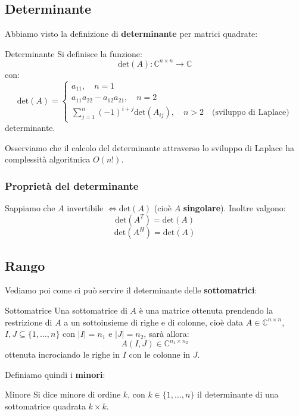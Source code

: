 \documentclass[a4paper,11pt]{article}
\begin{document}
\subsection{Determinante}
Abbiamo visto la definizione di \textbf{determinante} per matrici quadrate:
\begin{definition}{Determinante}
	Si definisce la funzione:
	$$
		\mathrm{det}(A) : \mathbb{C}^{n \times n} \rightarrow \mathbb{C}
	$$
	con:
	$$
		\mathrm{det}(A) =
			\begin{cases}
				a_{11}, \quad n = 1 \\ 
				a_{11} a_{22} - a_{12} a_{21}, \quad n = 2 \\ 
				\sum_{j = 1}^n (-1)^{i + j} \mathrm{det}(A_{ij}), \quad n > 2 \quad \text{(sviluppo di Laplace)}
			\end{cases}
	$$
	determinante.
\end{definition}

Osserviamo che il calcolo del determinante attraverso lo sviluppo di Laplace ha complessità algoritmica $O(n!)$.

\subsubsection{Proprietà del determinante}
Sappiamo che $A$ invertibile $\Leftrightarrow \mathrm{det}(A)$ (cioè $A$ \textbf{singolare}).
Inoltre valgono:
$$
\mathrm{det}(A^T) = \mathrm{det}(A)
$$
$$
\mathrm{det}(A^H) = \overline{\mathrm{det}(A)}
$$

\subsection{Rango}
Vediamo poi come ci può servire il determinante delle \textbf{sottomatrici}:
\begin{definition}{Sottomatrice}
	Una sottomatrice di $A$ è una matrice ottenuta prendendo la restrizione di $A$ a un sottoinsieme di righe e di colonne, cioè data $A \in \mathbb{C}^{n \times n}$, $I, J \subseteq \{ 1, ..., n \}$ con $|I| = n_1$ e $|J| = n_2$, sarà allora:
	$$
		A(I, J) \in \mathbb{C}^{n_1 \times n_2}
	$$
	ottenuta incrociando le righe in $I$ con le colonne in $J$.
\end{definition}

Definiamo quindi i \textbf{minori}:
\begin{definition}{Minore}
	Si dice minore di ordine $k$, con $k \in \{ 1, ..., n \}$ il determinante di una sottomatrice quadrata $k \times k$.
\end{definition}
\end{document}
